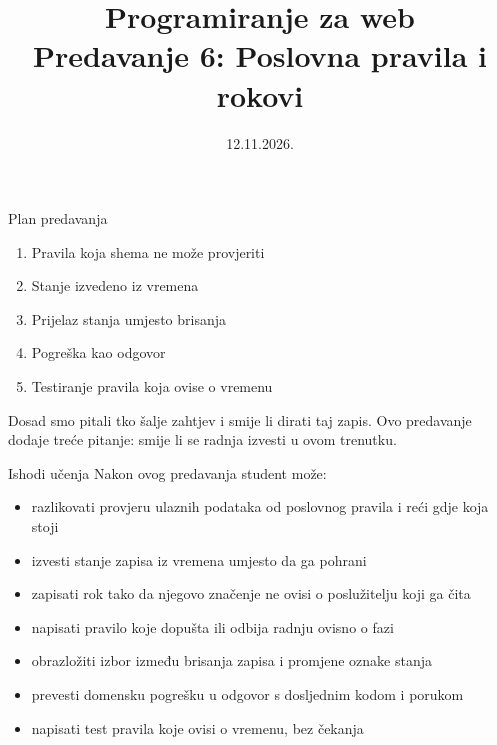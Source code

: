 

\title[Predavanje 6: Poslovna pravila]{Programiranje za web \\ Predavanje 6: Poslovna pravila i rokovi}
\date{12.11.2026.}



\frame{\titlepage}

\begin{frame}{Plan predavanja}
\begin{enumerate}
  \item Pravila koja shema ne može provjeriti
  \item Stanje izvedeno iz vremena
  \item Prijelaz stanja umjesto brisanja
  \item Pogreška kao odgovor
  \item Testiranje pravila koja ovise o vremenu
\end{enumerate}

\vspace{0.6em}
Dosad smo pitali tko šalje zahtjev i smije li dirati taj zapis. Ovo predavanje dodaje treće pitanje: smije li se radnja izvesti u ovom trenutku.
\end{frame}

\begin{frame}{Ishodi učenja}
Nakon ovog predavanja student može:

\begin{itemize}
  \item razlikovati provjeru ulaznih podataka od poslovnog pravila i reći gdje koja stoji
  \item izvesti stanje zapisa iz vremena umjesto da ga pohrani
  \item zapisati rok tako da njegovo značenje ne ovisi o poslužitelju koji ga čita
  \item napisati pravilo koje dopušta ili odbija radnju ovisno o fazi
  \item obrazložiti izbor između brisanja zapisa i promjene oznake stanja
  \item prevesti domensku pogrešku u odgovor s dosljednim kodom i porukom
  \item napisati test pravila koje ovisi o vremenu, bez čekanja
\end{itemize}
\end{frame}

